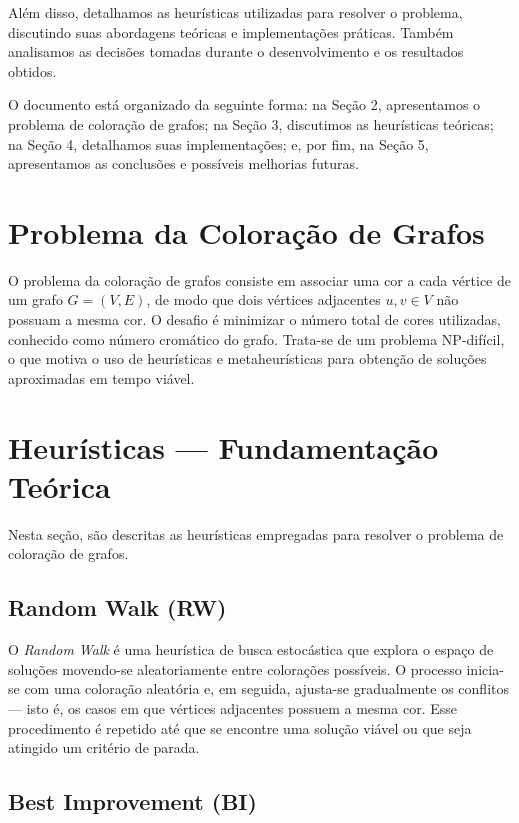 \documentclass[12pt,a4paper]{article}
\begin{document}
Além disso, detalhamos as heurísticas utilizadas para resolver o problema, discutindo suas abordagens teóricas e implementações práticas. Também analisamos as decisões tomadas durante o desenvolvimento e os resultados obtidos.

O documento está organizado da seguinte forma: na Seção 2, apresentamos o problema de coloração de grafos; na Seção 3, discutimos as heurísticas teóricas; na Seção 4, detalhamos suas implementações; e, por fim, na Seção 5, apresentamos as conclusões e possíveis melhorias futuras.
\section{Problema da Coloração de Grafos}
\label{sec:problema}

O problema da coloração de grafos consiste em associar uma cor a cada vértice de um grafo \( G = (V, E) \), de modo que dois vértices adjacentes \( u, v \in V \) não possuam a mesma cor. O desafio é minimizar o número total de cores utilizadas, conhecido como número cromático do grafo. Trata-se de um problema NP-difícil, o que motiva o uso de heurísticas e metaheurísticas para obtenção de soluções aproximadas em tempo viável.

\section{Heurísticas — Fundamentação Teórica}
\label{sec:heuristicas}

Nesta seção, são descritas as heurísticas empregadas para resolver o problema de coloração de grafos.

\subsection{Random Walk (RW)}

O \textit{Random Walk} é uma heurística de busca estocástica que explora o espaço de soluções movendo-se aleatoriamente entre colorações possíveis. O processo inicia-se com uma coloração aleatória e, em seguida, ajusta-se gradualmente os conflitos — isto é, os casos em que vértices adjacentes possuem a mesma cor. Esse procedimento é repetido até que se encontre uma solução viável ou que seja atingido um critério de parada.

\subsection{Best Improvement (BI)}
\end{document}
